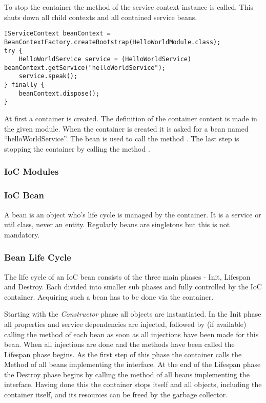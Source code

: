 To stop the \AMBETH{} container the method  of the service context instance is called. This shuts down all child contexts and all contained service beans.

\begin{lstlisting}[style=Java,caption={How to start, use and stop an \AMBETH{} Bean Container}]
IServiceContext beanContext = BeanContextFactory.createBootstrap(HelloWorldModule.class);
try {
	HelloWorldService service = (HelloWorldService) beanContext.getService("helloWorldService");
	service.speak();
} finally {
	beanContext.dispose();
}
\end{lstlisting}
At first a container is created. The definition of the container content is made in the given module. When the container is created it is asked for a bean named ``helloWorldService''. The bean is used to call the method . The last step is stopping the container by calling the method .

\subsubsection{IoC Modules}
\TODO
\subsubsection{IoC Bean}
A bean is an object who's life cycle is managed by the container. It is a service or util class, never an entity. Regularly beans are singletons but this is not mandatory.

\subsubsection{Bean Life Cycle}

The life cycle of an IoC bean consists of the three main phases - Init, Lifespan and Destroy. Each divided into smaller sub phases and fully controlled by the \AMBETH{} IoC container. Acquiring such a bean has to be done via the container.

Starting with the \textit{Constructor} phase all objects are instantiated. In the Init phase all properties and service dependencies are injected, followed by (if available) calling the  method of each bean as soon as all injections have been made for this bean.
When all injections are done and the  methods have been called the Lifespan phase begins. As the first step of this phase the container calls the  Method of all beans implementing the  interface.
At the end of the Lifespan phase the Destroy phase begins by calling the  method of all beans implementing the  interface. Having done this the container stops itself and all objects, including the container itself, and its resources can be freed by the garbage collector.

